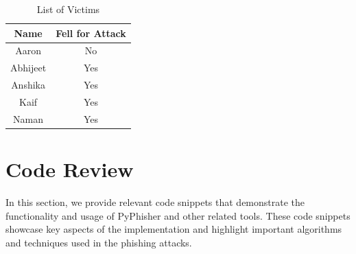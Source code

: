 \documentclass[openany]{report}
\begin{document}
\begin{table}[htbp]
    \centering
    \abovecaptionskip=10pt %
    \begin{tabular}{|c|c|}
        \hline
        \textbf{Name} & \textbf{Fell for Attack} \\
        \hline
        Aaron         & No                       \\
        \hline
        Abhijeet      & Yes                      \\
        \hline
        Anshika       & Yes                      \\
        \hline
        Kaif          & Yes                      \\
        \hline
        Naman         & Yes                      \\
        \hline
    \end{tabular}
    \caption{List of Victims}
    \label{tab:my_label}
\end{table}


\chapter{Code Review}
% 

In this section, we provide relevant code snippets that demonstrate the functionality and usage of PyPhisher and other related tools. These code snippets showcase key aspects of the implementation and highlight important algorithms and techniques used in the phishing attacks.\\
\end{document}
